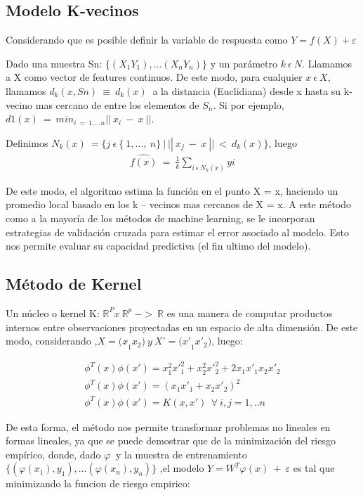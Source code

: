 \documentclass[12pt]{article}
\begin{document}
\subsection{Modelo K-vecinos}

Considerando que es posible definir la variable de respuesta como {$Y = f(X) + \varepsilon$} 

Dado una muestra Sn: {$\{(X_1Y_1),...(X_nY_n)\}$} y un parámetro {$k\ \epsilon\ N $}. Llamamos a X como vector de features continuos. De este modo, para cualquier {$x\ \epsilon\ X$}, llamamos {$d_k(x,Sn)\ \equiv\ d_k(x)\ $} a la distancia (Euclidiana) desde x hasta su k-vecino mas cercano de entre los elementos de {$S_n$}. Si por ejemplo, {$d1(x)\ =\ {min}_{i\ =\ 1,...n}||\ x_i\ -\ x\ || $}.

Definimos {$ N_k(x)\ =\{j\ \epsilon\ \{ \ 1,...,\ n\}\ |\ ||\ x_j\ -\ x\ ||\ <\ d_k(x)\} $}, luego 
\begin{align*}
\widehat{f(x)}\ =\ \frac{1}{k}\sum_{i\ \epsilon\ N_k(x)} y i
\end{align*}

De este modo, el algoritmo estima la función en el punto X = x, haciendo un promedio local basado en los k – vecinos mas cercanos de X = x. 
A este método como a la mayoría de los métodos de machine learning, se le incorporan estrategias de validación cruzada para estimar el error asociado al modelo. Esto nos permite evaluar su capacidad predictiva (el fin ultimo del modelo). 

\subsection{Método de Kernel}

Un núcleo o kernel K: {$ \mathbb{R}^Px\ \mathbb{R}^p\ ->\ \mathbb{R} $} es una manera de computar productos internos entre observaciones proyectadas en un espacio de alta dimensión. De este modo, considerando ,{$ X = {(x}_1x_2) \ y \  X’ = {(x\prime}_1{x\prime}_2) $}, luego:

\begin{align*}
\phi^{T}(x)\phi(x') = x^{2}_{1}x'^{2}_{1} + x^{2}_{2}x'^{2}_{2} +  2x_{1}x'_{1}x_{2}x'_{2}
\\
\phi^{T}(x)\phi(x') = {(x_{1}x'_{1} + x_{2}x'_{2})}^{2}  
\\
\phi^{T}(x)\phi(x') = K(x,x')  \ \ \forall \ i,j = 1,..n
\end{align*}

De esta forma, el método nos permite transformar problemas no lineales en formas lineales, ya que se puede demostrar que de la minimización del riesgo empírico, donde, dado {$ \varphi\ $} y la muestra de entrenamiento {$ \{( \varphi(x_1),y_1),\ldots(\varphi(x_n),y_n) \} $} ,el modelo {$ Y = W^T\varphi(x)\ +\ \varepsilon $} es tal que minimizando la funcion de riesgo empirico:
\end{document}
